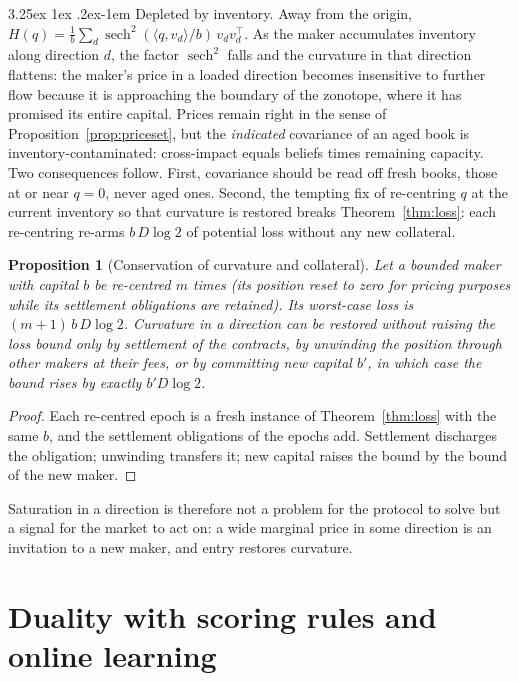 \documentclass[11pt]{article}
\makeatletter
\renewcommand\paragraph{\@startsection{paragraph}{4}{\z@}%
  {3.25ex \@plus1ex \@minus.2ex}{-1em}%
  {\normalfont\normalsize\itshape}}
\newtheorem{proposition}[theorem]{Proposition}
\theoremstyle{definition}
\theoremstyle{remark}
\newcommand{\ip}[2]{\langle #1,#2\rangle}
\newcommand{\sech}{\operatorname{sech}}
\makeatother
\begin{document}
\paragraph{Depleted by inventory.} Away from the origin,
$H(q)=\tfrac1b\sum_d\sech^{2}(\ip{q}{v_d}/b)\,v_dv_d^{\top}$. As the maker accumulates inventory along direction
$d$, the factor $\sech^2$ falls and the curvature in that direction flattens: the maker's price in a loaded
direction becomes insensitive to further flow because it is approaching the boundary of the zonotope, where it has
promised its entire capital. Prices remain right in the sense of Proposition~\ref{prop:priceset}, but the
\emph{indicated} covariance of an aged book is inventory-contaminated: cross-impact equals beliefs times remaining
capacity. Two consequences follow. First, covariance should be read off fresh books, those at or near $q=0$, never
aged ones. Second, the tempting fix of re-centring $q$ at the current inventory so that curvature is restored breaks
Theorem~\ref{thm:loss}: each re-centring re-arms $b\,D\log2$ of potential loss without any new collateral.

\begin{proposition}[Conservation of curvature and collateral]\label{prop:conservation}
Let a bounded maker with capital $b$ be re-centred $m$ times (its position reset to zero for pricing purposes while
its settlement obligations are retained). Its worst-case loss is $(m+1)\,b\,D\log 2$. Curvature in a direction can be
restored without raising the loss bound only by settlement of the contracts, by unwinding the position through
other makers at their fees, or by committing new capital $b'$, in which case the bound rises by exactly $b'D\log2$.
\end{proposition}

\begin{proof}
Each re-centred epoch is a fresh instance of Theorem~\ref{thm:loss} with the same $b$, and the settlement
obligations of the epochs add. Settlement discharges the obligation; unwinding transfers it; new capital raises the
bound by the bound of the new maker.
\end{proof}

Saturation in a direction is therefore not a problem for the protocol to solve but a signal for the market to
act on: a wide marginal price in some direction is an invitation to a new maker, and entry restores curvature.

\section{Duality with scoring rules and online learning}\label{sec:duality}
\end{document}
